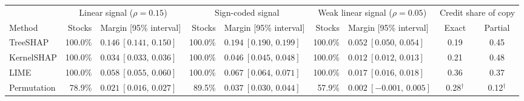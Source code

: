 \begin{tabular}{@{}l rl rl rl cc@{}}
\toprule
 & \multicolumn{2}{c}{Linear signal ($\rho{=}0.15$)} & \multicolumn{2}{c}{Sign-coded signal} & \multicolumn{2}{c}{Weak linear signal ($\rho{=}0.05$)} & \multicolumn{2}{c}{Credit share of copy} \\
\cmidrule(lr){2-3}\cmidrule(lr){4-5}\cmidrule(lr){6-7}\cmidrule(l){8-9}
Method & Stocks & Margin [95\% interval] & Stocks & Margin [95\% interval] & Stocks & Margin [95\% interval] & Exact & Partial \\
\midrule
TreeSHAP & 100.0\% & $0.146\ [0.141,\,0.150]$ & 100.0\% & $0.194\ [0.190,\,0.199]$ & 100.0\% & $0.052\ [0.050,\,0.054]$ & 0.19 & 0.45 \\
KernelSHAP & 100.0\% & $0.034\ [0.033,\,0.036]$ & 100.0\% & $0.046\ [0.045,\,0.048]$ & 100.0\% & $0.012\ [0.012,\,0.013]$ & 0.21 & 0.48 \\
LIME & 100.0\% & $0.058\ [0.055,\,0.060]$ & 100.0\% & $0.067\ [0.064,\,0.071]$ & 100.0\% & $0.017\ [0.016,\,0.018]$ & 0.36 & 0.37 \\
Permutation & 78.9\% & $0.021\ [0.016,\,0.027]$ & 89.5\% & $0.037\ [0.030,\,0.044]$ & 57.9\% & $0.002\ [-0.001,\,0.005]$ & 0.28$^{\dagger}$ & 0.12$^{\dagger}$ \\
\bottomrule
\end{tabular}
